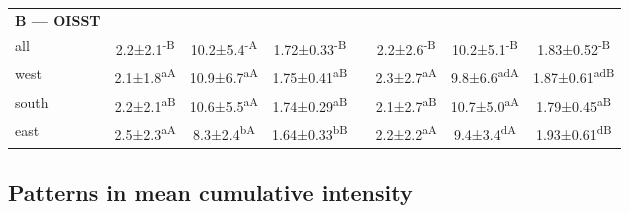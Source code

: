 \documentclass[a4paper,10pt,review]{elsarticle}
\begin{document}
\begin{table}[]
\begin{tiny}
\begin{tabular}{lccccccc}
{\bf{B --- OISST}} \\
all & 2.2±2.1\textsuperscript{-B} & 10.2±5.4\textsuperscript{-A} & 1.72±0.33\textsuperscript{-B} && 2.2±2.6\textsuperscript{-B} & 10.2±5.1\textsuperscript{-B} & 1.83±0.52\textsuperscript{-B} \\
west & 2.1±1.8\textsuperscript{aA} & 10.9±6.7\textsuperscript{aA} & 1.75±0.41\textsuperscript{aB} && 2.3±2.7\textsuperscript{aA} & 9.8±6.6\textsuperscript{adA} & 1.87±0.61\textsuperscript{adB} \\
south & 2.2±2.1\textsuperscript{aB} & 10.6±5.5\textsuperscript{aA} & 1.74±0.29\textsuperscript{aB} && 2.1±2.7\textsuperscript{aB} & 10.7±5.0\textsuperscript{aA} & 1.79±0.45\textsuperscript{aB} \\
east & 2.5±2.3\textsuperscript{aA} & 8.3±2.4\textsuperscript{bA} & 1.64±0.33\textsuperscript{bB} && 2.2±2.2\textsuperscript{aA} & 9.4±3.4\textsuperscript{dA} & 1.93±0.61\textsuperscript{dB} \\
\bottomrule
\end{tabular}
\end{tiny}
\end{table}

\subsection{Patterns in mean cumulative intensity}
\end{document}
